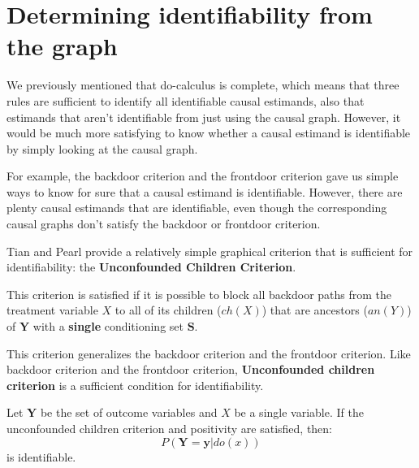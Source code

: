\section{Determining identifiability from the graph}
We previously mentioned that do-calculus is complete, which means that three rules
are sufficient to identify all identifiable causal estimands, also that estimands
that aren't identifiable from just using the causal graph. However, it would be
much more satisfying to know whether a causal estimand is identifiable by simply
looking at the causal graph.

For example, the backdoor criterion and the frontdoor criterion gave us simple
ways to know for sure that a causal estimand is identifiable. However, there are
plenty causal estimands that are identifiable, even though the corresponding
causal graphs don't satisfy the backdoor or frontdoor criterion.

Tian and Pearl provide a relatively simple graphical criterion that is sufficient
for identifiability: the \textbf{Unconfounded Children Criterion}.

\begin{definition}
    This criterion is satisfied if it is possible to block all backdoor paths
    from the treatment variable $X$ to all of its children ($ch(X)$) that are
    ancestors ($an(Y)$) of $\mathbf{Y}$ with a \textbf{single} conditioning set $\mathbf{S}$.
\end{definition}

This criterion generalizes the backdoor criterion and the frontdoor criterion.
Like backdoor criterion and the frontdoor criterion, \textbf{Unconfounded children
    criterion} is a sufficient condition for identifiability.

\begin{definition}
    Let $\mathbf{Y}$ be the set of outcome variables and $X$ be a single variable.
    If the unconfounded children criterion and positivity are satisfied, then:
    \begin{equation}
        P(\mathbf{Y} = \mathbf{y} |do(x))
    \end{equation}
    is identifiable.
\end{definition}

